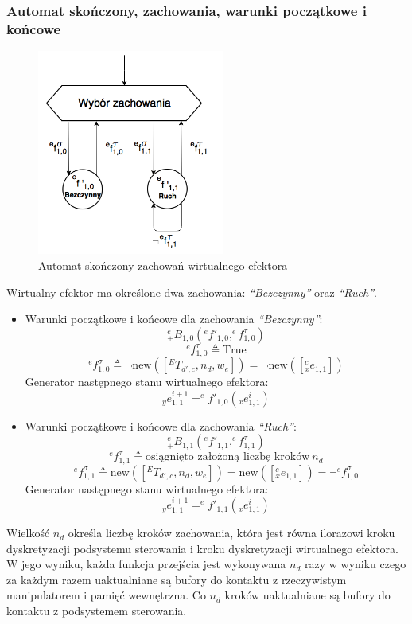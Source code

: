 \documentclass{article}
\begin{document}
\subsubsection{Automat skończony, zachowania, warunki początkowe i końcowe}
\begin{figure}[H]
	\centering
	\includegraphics[width=0.55\textwidth]{WE_automat.png}
	\caption{Automat skończony zachowań wirtualnego efektora}
	\label{fig::WE_automat}
\end{figure}

Wirtualny efektor ma okre\'slone dwa zachowania: \textit{``Bezczynny''} oraz \textit{``Ruch''}. 
\newline
\begin{itemize}
\item Warunki początkowe i końcowe dla zachowania \textit{``Bezczynny''}:
\[^e_+B_{1,0}( ^{e}f'_{1,0}, ^ef^\tau_{1,0} )\]
\[^ef^\tau_{1,0} \triangleq \mbox{True}\]
\[^ef^\sigma_{1,0} \triangleq \neg \mbox{new}([^ET_{d',c}, n_d, w_e])= \neg \mbox{new}([^c_xe_{1,1}])\]
Generator następnego stanu wirtualnego efektora:
\[ _ye^{i+1}_{1,1} = ^{e}f'_{1,0}(_xe^i_{1,1})\]

\item Warunki początkowe i końcowe dla zachowania \textit{``Ruch''}:
\[^e_+B_{1,1}( ^{e}f'_{1,1}, ^ef^\tau_{1,1} )\]
\[^ef^\tau_{1,1} \triangleq \mbox{osiągnięto założoną liczbę kroków} ~n_d\]
\[^ef^\sigma_{1,1} \triangleq \mbox{new}([^ET_{d',c}, n_d, w_e]) = \mbox{new}([^c_xe_{1,1}]) = \neg ^ef^\sigma_{1,0}\]
Generator następnego stanu wirtualnego efektora:
\[ _ye^{i+1}_{1,1} = ^{e}f'_{1,1}(_xe^i_{1,1})\]
\end{itemize}

Wielko\'sć $n_d$ okre\'sla liczbę kroków zachowania, która jest równa ilorazowi kroku dyskretyzacji podsystemu sterowania i kroku dyskretyzacji wirtualnego efektora. W jego wyniku, każda funkcja przej\'scia jest wykonywana $n_d$ razy w wyniku czego za każdym razem uaktualniane są bufory do kontaktu z rzeczywistym manipulatorem i pamięć wewnętrzna. Co $n_d$ kroków uaktualniane są bufory do kontaktu z podsystemem sterowania.
\end{document}

